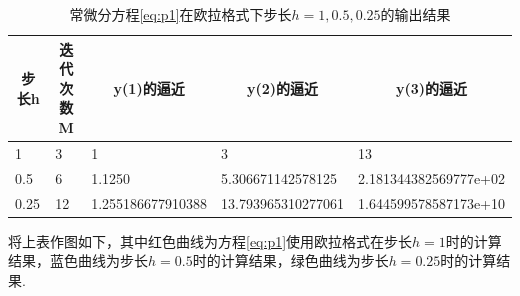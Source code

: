 \documentclass[UTF8]{ctexart}
\begin{document}
\begin{table}[h]
	\centering
	\caption{常微分方程\ref{eq:p1}在欧拉格式下步长$h=1, 0.5, 0.25$的输出结果}
	\label{table:euler}
	\begin{tabular}{lllll}
		\hline
		\multicolumn{1}{c}{\textbf{步长h}} & \multicolumn{1}{c}{\textbf{迭代次数M}} & \multicolumn{1}{c}{\textbf{y(1)的逼近}} & \multicolumn{1}{c}{\textbf{y(2)的逼近}} & \multicolumn{1}{c}{\textbf{y(3)的逼近}} \\ \hline
		1                                & 3                                  & 1                                    & 3                                    & 13                                   \\ \hline
		0.5                              & 6                                  & 1.1250                               & 5.306671142578125                    & 2.181344382569777e+02                \\ \hline
		0.25                             & 12                                 & 1.255186677910388                    & 13.793965310277061                   & 1.644599578587173e+10                \\ \hline
	\end{tabular}
\end{table}
将上表作图如下，其中红色曲线为方程\ref{eq:p1}使用欧拉格式在步长$h=1$时的计算结果，蓝色曲线为步长$h=0.5$时的计算结果，绿色曲线为步长$h=0.25$时的计算结果.
\end{document}
